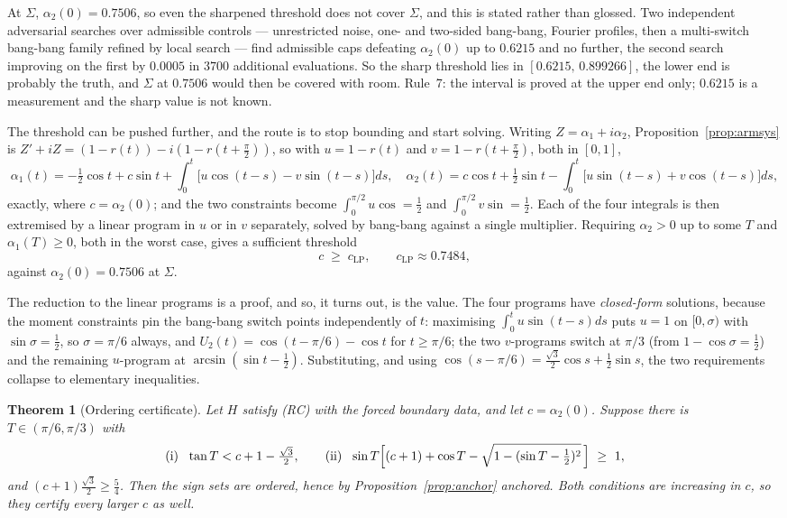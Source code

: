 \documentclass[11pt]{article}
\newtheorem{theorem}{Theorem}
\theoremstyle{definition}
\newcommand{\Sig}{\Sigma}
\begin{document}
At $\Sig$, $\alpha_2(0)=0.7506$, so even the sharpened threshold does not cover $\Sig$,
and this is stated rather than glossed. Two independent adversarial searches over
admissible controls --- unrestricted noise, one- and two-sided bang-bang, Fourier profiles,
then a multi-switch bang-bang family refined by local search --- find admissible caps
defeating $\alpha_2(0)$ up to $0.6215$ and no further, the second search improving on the
first by $0.0005$ in $3700$ additional evaluations. So the sharp threshold lies in
$[0.6215,\,0.899266]$, the lower end is probably the truth, and $\Sig$ at $0.7506$ would
then be covered with room. Rule~7: the interval is proved at the upper end only; $0.6215$
is a measurement and the sharp value is not known.

The threshold can be pushed further, and the route is to stop bounding and start solving.
Writing $Z=\alpha_1+i\alpha_2$, Proposition~\ref{prop:armsys} is
$Z'+iZ=(1-r(t))-i(1-r(t+\tfrac\pi2))$, so with $u=1-r(t)$ and $v=1-r(t+\tfrac\pi2)$, both
in $[0,1]$,
\[
  \alpha_1(t)=-\tfrac12\cos t+c\sin t+\int_0^t\!\bigl[u\cos(t-s)-v\sin(t-s)\bigr]ds ,\quad
  \alpha_2(t)= c\cos t+\tfrac12\sin t-\int_0^t\!\bigl[u\sin(t-s)+v\cos(t-s)\bigr]ds ,
\]
exactly, where $c=\alpha_2(0)$; and the two constraints become
$\int_0^{\pi/2}u\cos=\tfrac12$ and $\int_0^{\pi/2}v\sin=\tfrac12$. Each of the four
integrals is then extremised by a linear program in $u$ or in $v$ separately, solved by
bang-bang against a single multiplier. Requiring $\alpha_2>0$ up to some $T$ and
$\alpha_1(T)\ge0$, both in the worst case, gives a sufficient threshold
\[
  c \;\ge\; c_{\mathrm{LP}} , \qquad c_{\mathrm{LP}}\approx0.7484 ,
\]
against $\alpha_2(0)=0.7506$ at $\Sig$.

The reduction to the linear programs is a proof, and so, it turns out, is the value. The
four programs have \emph{closed-form} solutions, because the moment constraints pin the
bang-bang switch points independently of $t$: maximising $\int_0^t u\sin(t-s)ds$ puts
$u=1$ on $[0,\sigma)$ with $\sin\sigma=\tfrac12$, so $\sigma=\pi/6$ always, and
$U_2(t)=\cos(t-\pi/6)-\cos t$ for $t\ge\pi/6$; the two $v$-programs switch at $\pi/3$
(from $1-\cos\sigma=\tfrac12$) and the remaining $u$-program at $\arcsin(\sin t-\tfrac12)$.
Substituting, and using $\cos(s-\pi/6)=\tfrac{\sqrt3}2\cos s+\tfrac12\sin s$, the two
requirements collapse to elementary inequalities.

\begin{theorem}[Ordering certificate]\label{thm:ordercert}
Let $H$ satisfy (RC) with the forced boundary data, and let $c=\alpha_2(0)$. Suppose there
is $T\in(\pi/6,\pi/3)$ with
\[
  \text{(i)}\ \ \tan T<c+1-\tfrac{\sqrt3}2 ,\qquad
  \text{(ii)}\ \ \sin T\Bigl[(c+1)+\cos T-\sqrt{1-(\sin T-\tfrac12)^2}\,\Bigr]\ \ge\ 1 ,
\]
and $(c+1)\tfrac{\sqrt3}2\ge\tfrac54$. Then the sign sets are ordered, hence by
Proposition~\ref{prop:anchor} anchored. Both conditions are increasing in $c$, so they
certify every larger $c$ as well.
\end{theorem}
\end{document}
